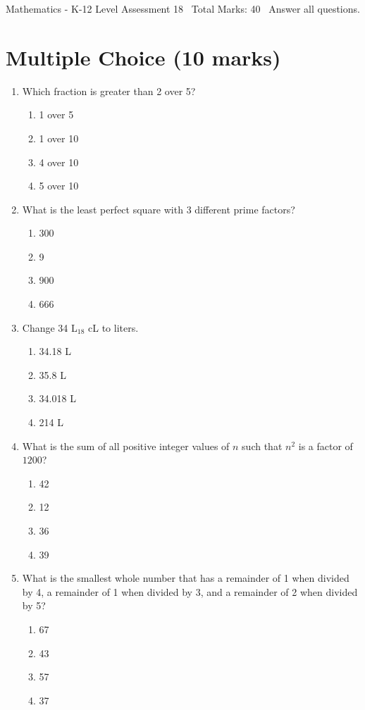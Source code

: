 \documentclass[12pt]{article}
\begin{document}
\begin{center}
Mathematics - K-12 Level Assessment 18 \
Total Marks: 40 \
Answer all questions.
\end{center}

\section*{Multiple Choice (10 marks)}
\begin{enumerate}[label=\arabic*.]
\item Which fraction is greater than 2 over 5?
\begin{enumerate}[label=(\alph*)]
    \item 1 over 5
    \item 1 over 10
    \item 4 over 10
    \item 5 over 10
\end{enumerate}
\item What is the least perfect square with 3 different prime factors?
\begin{enumerate}[label=(\alph*)]
    \item 300
    \item 9
    \item 900
    \item 666
\end{enumerate}
\item Change 34 L$_{18}$ cL to liters.
\begin{enumerate}[label=(\alph*)]
    \item 34.18 L
    \item 35.8 L
    \item 34.018 L
    \item 214 L
\end{enumerate}
\item What is the sum of all positive integer values of $n$ such that $n^2$ is a factor of $1200$?
\begin{enumerate}[label=(\alph*)]
    \item 42
    \item 12
    \item 36
    \item 39
\end{enumerate}
\item What is the smallest whole number that has a remainder of 1 when divided by 4, a remainder of 1 when divided by 3, and a remainder of 2 when divided by 5?
\begin{enumerate}[label=(\alph*)]
    \item 67
    \item 43
    \item 57
    \item 37
\end{enumerate}
\end{enumerate}
\end{document}
